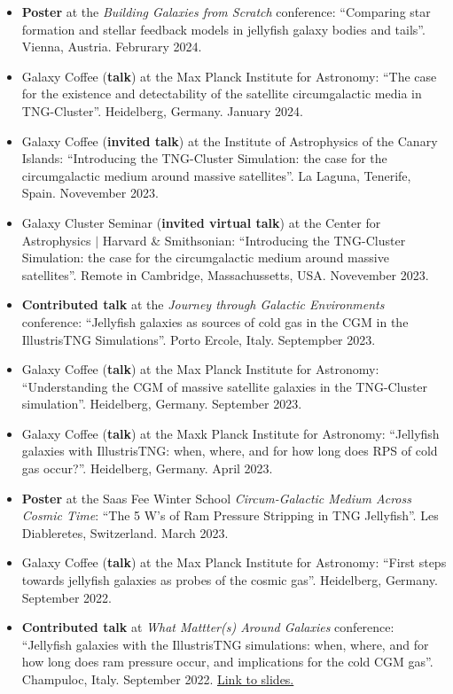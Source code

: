 \documentclass[a4paper,10pt,oneside]{article}
\begin{document}
\begin{itemize}[wide, labelwidth=!, labelindent=-11pt, parsep=0pt]
    \item {\bf Poster} at the {\it Building Galaxies from Scratch} conference: ``Comparing star formation and stellar feedback models in jellyfish galaxy bodies and tails''. Vienna, Austria. Februrary 2024.
    \item Galaxy Coffee ({\bf talk}) at the Max Planck Institute for Astronomy: ``The case for the existence and detectability of the satellite circumgalactic media in TNG-Cluster''. Heidelberg, Germany. January 2024.
    \item Galaxy Coffee ({\bf invited talk}) at the Institute of Astrophysics of the Canary Islands: ``Introducing the TNG-Cluster Simulation: the case for the circumgalactic medium around massive satellites''. La Laguna, Tenerife, Spain. Novevember 2023.
    \item Galaxy Cluster Seminar ({\bf invited virtual talk}) at the Center for Astrophysics $\vert$ Harvard \& Smithsonian: ``Introducing the TNG-Cluster Simulation: the case for the circumgalactic medium around massive satellites''. Remote in Cambridge, Massachussetts, USA. Novevember 2023. 
    \item {\bf Contributed talk} at the {\it Journey through Galactic Environments} conference: ``Jellyfish galaxies as sources of cold gas in the CGM in the IllustrisTNG Simulations''. Porto Ercole, Italy. Septempber 2023.
    \item Galaxy Coffee ({\bf talk}) at the Max Planck Institute for Astronomy: ``Understanding the CGM of massive satellite galaxies in the TNG-Cluster simulation''. Heidelberg, Germany. September 2023.
    \item Galaxy Coffee ({\bf talk}) at the Maxk Planck Institute for Astronomy: ``Jellyfish galaxies with IllustrisTNG: when, where, and for how long does RPS of cold gas occur?''. Heidelberg, Germany. April 2023.
    \item {\bf Poster} at the Saas Fee Winter School {\it Circum-Galactic Medium Across Cosmic Time}: ``The 5 W's of Ram Pressure Stripping in TNG Jellyfish''. Les Diableretes, Switzerland. March 2023.
    \item Galaxy Coffee ({\bf talk}) at the Max Planck Institute for Astronomy: ``First steps towards jellyfish galaxies as probes of the cosmic gas''. Heidelberg, Germany. September 2022.
    \item {\bf Contributed talk} at {\it What Mattter(s) Around Galaxies} conference: ``Jellyfish galaxies with the IllustrisTNG simulations: when, where, and for how long does ram pressure occur, and implications for the cold CGM gas''. Champuloc, Italy. September 2022. \href{https://drive.google.com/file/u/0/d/1x4FNVCmUWTFwznOAs9RYhLwkKl-kmhZT/view?usp=drive_web}{Link to slides.}

\end{itemize}
\end{document}
